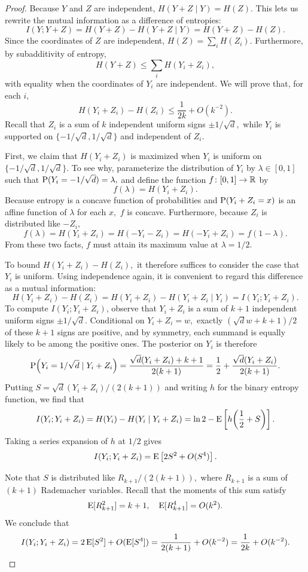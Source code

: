 \begin{proof}
Because $Y$ and $Z$ are independent, $H(Y + Z \mid Y) = H(Z).$ This lets us rewrite the mutual information as a difference of entropies:
$$
I(Y; Y + Z) = H(Y + Z) - H(Y + Z \mid Y) = H(Y + Z) - H(Z).
$$
Since the coordinates of $Z$ are independent, $H(Z) = \sum_i H(Z_i).$ Furthermore, by subadditivity of entropy,
$$
H(Y + Z) \le \sum_i H(Y_i + Z_i),
$$
with equality when the coordinates of $Y_i$ are independent. We will prove that, for each $i,$
$$
H(Y_i + Z_i) - H(Z_i) \le \frac{1}{2 k} + O(k^{-2}).
$$
Recall that $Z_i$ is a sum of $k$ independent uniform signs $\pm 1/\sqrt{d},$ while $Y_i$ is supported on $\{-1/\sqrt{d}, 1/\sqrt{d}\}$ and independent of $Z_i.$

First, we claim that $H(Y_i + Z_i)$ is maximized when $Y_i$ is uniform on $\{-1/\sqrt{d}, 1/\sqrt{d}\}.$ To see why, parameterize the distribution of $Y_i$ by $\lambda \in [0, 1]$ such that $\operatorname{P}(Y_i = -1/\sqrt{d}) = \lambda,$ and define the function $f \colon [0, 1] \to \mathbb{R}$ by
$$
f(\lambda) = H(Y_i + Z_i).
$$
Because entropy is a concave function of probabilities and $\operatorname{P}(Y_i + Z_i = x)$ is an affine function of $\lambda$ for each $x,$ $f$ is concave. Furthermore, because $Z_i$ is distributed like $-Z_i,$
$$
f(\lambda) = H(Y_i + Z_i) = H(-Y_i - Z_i) = H(- Y_i + Z_i) = f(1 - \lambda).
$$
From these two facts, $f$ must attain its maximum value at $\lambda = 1/2.$

To bound $H(Y_i + Z_i) - H(Z_i),$ it therefore suffices to consider the case that $Y_i$ is uniform. Using independence again, it is convenient to regard this difference as a mutual information:
$$
H(Y_i + Z_i) - H(Z_i) = H(Y_i + Z_i) - H(Y_i + Z_i \mid Y_i) = I(Y_i; Y_i + Z_i).
$$
To compute $I(Y_i; Y_i + Z_i)$, observe that $Y_i + Z_i$ is a sum of $k + 1$ independent uniform signs $\pm 1/\sqrt{d}.$ Conditional on $Y_i + Z_i = w,$ exactly $(\sqrt{d} w + k + 1)/2$ of these $k + 1$ signs are positive, and by symmetry, each summand is equally likely to be among the positive ones. The posterior on $Y_i$ is therefore
$$
\operatorname{P}\!\left(Y_i = 1/\sqrt{d} \mid Y_i + Z_i\right) = \frac{\sqrt{d} (Y_i + Z_i) + k + 1}{2(k + 1)} = \frac 1 2 + \frac{\sqrt{d} (Y_i + Z_i)}{2(k + 1)}.
$$
Putting $S = \sqrt{d} (Y_i + Z_i)/(2(k+1))$ and writing $h$ for the binary entropy function, we find that
$$
I(Y_i; Y_i + Z_i) = H(Y_i) - H(Y_i \mid Y_i + Z_i) = \ln 2 - \operatorname{E} \left[ h\!\left(\frac{1}{2} + S\right)\right].
$$
Taking a series expansion of $h$ at $1/2$ gives
$$
I(Y_i; Y_i + Z_i) = \operatorname{E} \left[ 2 S^2 + O(S^4)\right].
$$

Note that $S$ is distributed like $R_{k + 1} / (2(k + 1)),$ where $R_{k + 1}$ is a sum of $(k + 1)$ Rademacher variables. Recall that the moments of this sum satisfy
$$
\operatorname{E}[R_{k + 1}^2] = k + 1, \quad \operatorname{E}[R_{k + 1}^4] = O(k^2).
$$
We conclude that
$$
I(Y_i; Y_i + Z_i) = 2 \operatorname{E}[S^2] + O(\operatorname{E}[S^4]) = \frac{1}{2(k+1)} + O(k^{-2}) = \frac{1}{2k} + O(k^{-2}).
$$
\end{proof}

